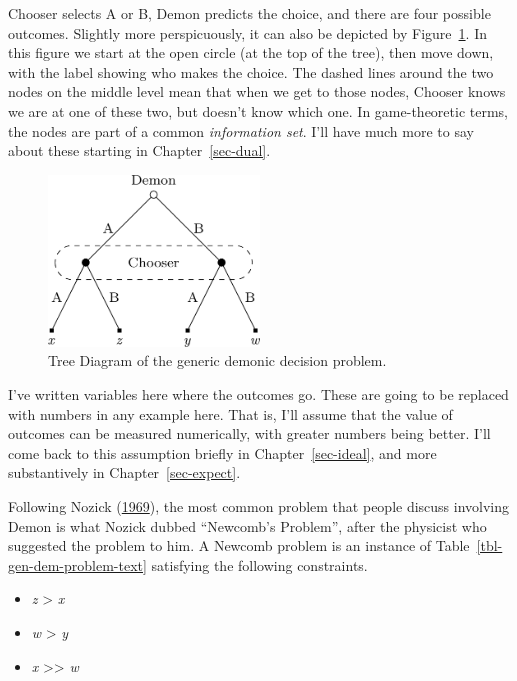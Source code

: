 \documentclass[
  12pt,
  letterpaper,
  DIV=11,
  numbers=noendperiod]{scrreprt}
\providecommand{\tightlist}{%
  \setlength{\itemsep}{0pt}\setlength{\parskip}{0pt}}\usepackage{longtable,booktabs,array}
\begin{document}
Chooser selects A or B, Demon predicts the choice, and there are four
possible outcomes. Slightly more perspicuously, it can also be depicted
by Figure~\ref{fig-gen-dem-problem-text}. In this figure we start at the
open circle (at the top of the tree), then move down, with the label
showing who makes the choice. The dashed lines around the two nodes on
the middle level mean that when we get to those nodes, Chooser knows we
are at one of these two, but doesn't know which one. In game-theoretic
terms, the nodes are part of a common \emph{information set}. I'll have
much more to say about these starting in Chapter~\ref{sec-dual}.

\begin{figure}

{\centering \includegraphics[width=0.5\textwidth,height=\textheight]{intro_files/figure-pdf/fig-gen-dem-problem-text-1.png}

}

\caption{\label{fig-gen-dem-problem-text}Tree Diagram of the generic
demonic decision problem.}

\end{figure}

I've written variables here where the outcomes go. These are going to be
replaced with numbers in any example here. That is, I'll assume that the
value of outcomes can be measured numerically, with greater numbers
being better. I'll come back to this assumption briefly in
Chapter~\ref{sec-ideal}, and more substantively in
Chapter~\ref{sec-expect}.

Following Nozick (\protect\hyperlink{ref-Nozick1969}{1969}), the most
common problem that people discuss involving Demon is what Nozick dubbed
``Newcomb's Problem'', after the physicist who suggested the problem to
him. A Newcomb problem is an instance of
Table~\ref{tbl-gen-dem-problem-text} satisfying the following
constraints.

\begin{itemize}
\tightlist
\item
  \emph{z} \textgreater{} \emph{x}
\item
  \emph{w} \textgreater{} \emph{y}
\item
  \emph{x} \textgreater\textgreater{} \emph{w}
\end{itemize}
\end{document}
